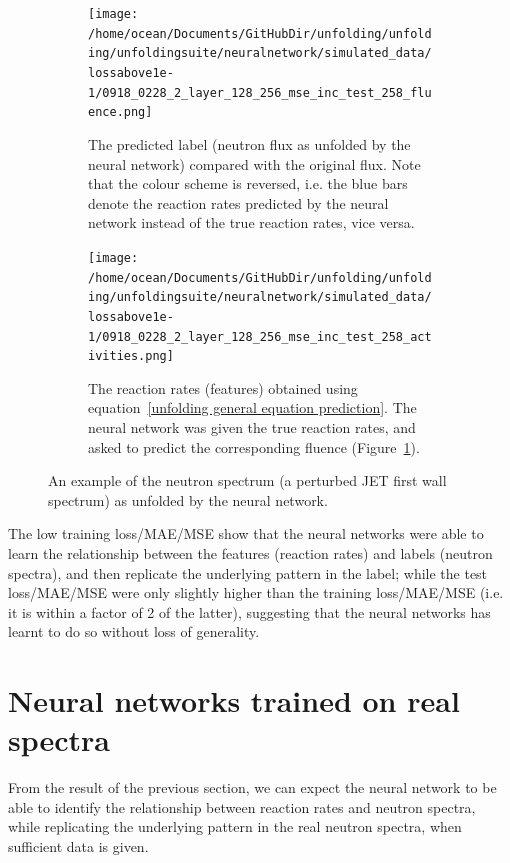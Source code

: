 \documentclass[a4paper, 12pt]{article}
\begin{document}
\begin{figure}
\centering
    \begin{subfigure}[b]{11cm}
    \texttt{[image: /home/ocean/Documents/GitHubDir/unfolding/unfolding/unfoldingsuite/neuralnetwork/simulated\_data/lossabove1e-1/0918\_0228\_2\_layer\_128\_256\_mse\_inc\_test\_258\_fluence.png]}
    \caption{The predicted label (neutron flux as unfolded by the neural network) compared with the original flux. Note that the colour scheme is reversed, i.e. the blue bars denote the reaction rates predicted by the neural network instead of the true reaction rates, vice versa.}\label{SimulatedFluence}
    \end{subfigure}
    \begin{subfigure}[b]{5cm}
    \texttt{[image: /home/ocean/Documents/GitHubDir/unfolding/unfolding/unfoldingsuite/neuralnetwork/simulated\_data/lossabove1e-1/0918\_0228\_2\_layer\_128\_256\_mse\_inc\_test\_258\_activities.png]}
    \caption{The reaction rates (features) obtained using equation~\ref{unfolding general equation prediction}. The neural network was given the true reaction rates, and asked to predict the corresponding fluence (Figure~\ref{SimulatedFluence}).}\label{SimulatedActivity}
    \end{subfigure}
\caption{An example of the neutron spectrum (a perturbed JET first wall spectrum) as unfolded by the neural network.} \label{SimulatedExample}
\end{figure}

    The low training loss/MAE/MSE show that the neural networks were able to learn the relationship between the features (reaction rates) and labels (neutron spectra), and then replicate the underlying pattern in the label; while the test loss/MAE/MSE were only slightly higher than the training loss/MAE/MSE (i.e. it is within a factor of 2 of the latter), suggesting that the neural networks has learnt to do so without loss of generality.

\section{Neural networks trained on real spectra}\label{RealResults}
From the result of the previous section, we can expect the neural network to be able to identify the relationship between reaction rates and neutron spectra, while replicating the underlying pattern in the real neutron spectra, when sufficient data is given.
\end{document}
